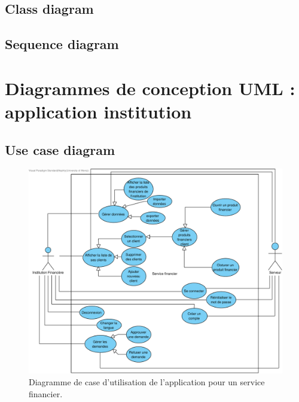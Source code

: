 \documentclass[]{report}
\begin{document}
\newpage


\subsection{Class diagram}

\newpage

\subsection{Sequence diagram}

\newpage



\section{Diagrammes de conception UML : application institution}



\subsection{Use case diagram}



\begin{figure}[h]
	\centering\includegraphics[width=\linewidth]{img/Use Case Institution.pdf}
	\caption{Diagramme de case d'utilisation de l'application pour un service financier.}
\end{figure}

\newpage
\end{document}
